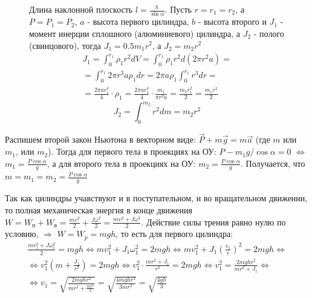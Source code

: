 \documentclass[a4paper,12pt]{article}
\begin{document}
\begin{figure}[H]
            Длина наклонной плоскость $l = \frac{h}{\sin\alpha}$. Пусть $r = r_1 = r_2$, а
            $P = P_1 = P_2$, $a$ - высота первого цилиндра, $b$ - высота второго
            и $J_1$ - момент инерции сплошного (алюминиевого) цилиндра, а
            $J_2$ - полого (свинцового), тогда $J_1 = 0.5m_1r^2$, а $J_2 = m_2r^2$
            \begin{multline}
                J_1 = \int_0^{r_1} \rho_1 r^2 dV = \int_0^{r_1} \rho_1 r^2 d(2\pi r^2 a)= \\ =
                \int_0^{r_1} 2\pi r^3 a\rho_1 dr = 2\pi a\rho_1\int_0^{r_1} r^3dr =\\
                = \frac{2\pi a r_1^4}{4} \cdot \rho_1 = \frac{2\pi a r_1^4}{4} \cdot
                \frac{m_1}{\pi r^2 a} = \frac{m_1r_1^2}{2} = \frac{m_1r^2}{2}
            \end{multline}
            \begin{equation}
                J_2 = \int_0^{m_2} r^2dm = m_2r^2
            \end{equation}
        \endminipage
    \end{figure}

    Распишем второй закон Ньютона в векторном виде:
    $\vec{P} + m\vec{g} = m\vec{a}$ (где $m$ или $m_1$, или $m_2$). Тогда для первого тела
    в проекциях на ОУ: $P - m_1g/\cos\alpha = 0$ $\Leftrightarrow$ $m_1 = \frac{P\cos\alpha}{g}$,
    а для
    второго тела в проекциях на ОУ: $m_2 = \frac{P\cos\alpha}{g}$.
    Получается, что $m = m_1 = m_2 = \frac{P\cos \alpha}{g}$

    Так как цилиндры учавствуют и в поступательном, и во вращательном движении, то
    полная механическая энергия в конце движения
    $W = W_{\text{п}} + W_{\text{в}} = \frac{mv^2}{2} + \frac{J\omega^2}{2} = \frac{mv^2 + J\omega^2}{2}$.
    Действие силы трения равно нулю по условию, $\Rightarrow$ $W = W_p = mgh$, то есть для
    первого цилиндра:
    \begin{multline}
        \frac{mv_1^2 + J\omega_1^2}{2} = mgh \Leftrightarrow
        mv_1^2 + J_1\omega_1^2 = 2mgh \Leftrightarrow
        mv_1^2 + J_1(\frac{v_1}{r})^2 = 2mgh \Leftrightarrow \\
        \Leftrightarrow
        v_1^2 (m + \frac{J_1}{r^2}) = 2mgh \Leftrightarrow
        v_1^2 \cdot \frac{mr^2 + J_1}{r^2} = 2mgh \Leftrightarrow
        v_1^2 = \frac{2mghr^2}{mr^2 + J_1} \Leftrightarrow \\
        \Leftrightarrow v_1 = \sqrt{
            \frac{2mghr^2}{mr^2 + \frac{mr^2}{2}}
        } = \sqrt{
            \frac{4mghr^2}{3mr^2}
        } = \sqrt{
            \frac{4gh}{3}
        }
    \end{multline}
\end{document}
